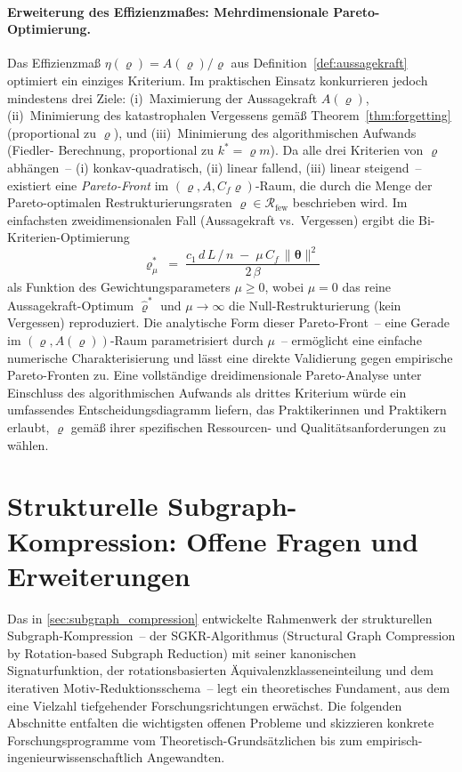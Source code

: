 ﻿\documentclass[12pt, a4paper, openany]{report}
\newcommand{\calR}{\mathcal{R}}
\begin{document}
\paragraph{Erweiterung des Effizienzmaßes: Mehrdimensionale
Pareto-Optimierung.}
Das Effizienzmaß $\eta(\varrho) = A(\varrho)/\varrho$ aus
Definition~\ref{def:aussagekraft} optimiert ein einziges Kriterium.  Im
praktischen Einsatz konkurrieren jedoch mindestens drei Ziele:
(i)~Maximierung der Aussagekraft $A(\varrho)$, (ii)~Minimierung des
katastrophalen Vergessens gemäß Theorem~\ref{thm:forgetting} (proportional
zu $\varrho$), und (iii)~Minimierung des algorithmischen Aufwands (Fiedler-
Berechnung, proportional zu $k^* = \varrho m$).  Da alle drei Kriterien
von $\varrho$ abhängen~-- (i) konkav-quadratisch, (ii) linear fallend,
(iii) linear steigend~-- existiert eine \emph{Pareto-Front} im
$(\varrho, A, C_f\varrho)$-Raum, die durch die Menge der Pareto-optimalen
Restrukturierungsraten $\varrho \in \calR_{\mathrm{few}}$ beschrieben wird.
Im einfachsten zweidimensionalen Fall (Aussagekraft vs.\ Vergessen) ergibt
die Bi-Kriterien-Optimierung
\[
  \varrho^*_{\mu}
  \;=\; \frac{c_1\,d\,L\,/\,n \;-\; \mu\,C_f\,\|\bm\theta\|^2}{2\,\beta}
\]
als Funktion des Gewichtungsparameters $\mu \geq 0$, wobei $\mu = 0$ das
reine Aussagekraft-Optimum $\hat\varrho^*$ und $\mu \to \infty$ die
Null-Restrukturierung (kein Vergessen) reproduziert.  Die analytische Form
dieser Pareto-Front~-- eine Gerade im $(\varrho, A(\varrho))$-Raum
parametrisiert durch $\mu$~-- ermöglicht eine einfache numerische
Charakterisierung und lässt eine direkte Validierung gegen empirische
Pareto-Fronten zu.  Eine vollständige dreidimensionale Pareto-Analyse unter
Einschluss des algorithmischen Aufwands als drittes Kriterium würde ein
umfassendes Entscheidungsdiagramm liefern, das Praktikerinnen und Praktikern
erlaubt, $\varrho$ gemäß ihrer spezifischen Ressourcen- und
Qualitätsanforderungen zu wählen.

\section{Strukturelle Subgraph-Kompression: Offene Fragen und Erweiterungen}
\label{sec:outlook_subgraph}

Das in \cref{sec:subgraph_compression} entwickelte Rahmenwerk der strukturellen
Subgraph-Kom\-pression~-- der SGKR-Algorithmus (Structural Graph Compression by
Rotation-based Subgraph Reduction) mit seiner kanonischen Signaturfunktion,
der rotationsbasierten Äquivalenzklasseneinteilung und dem iterativen
Motiv-Reduktionsschema~-- legt ein theoretisches Fundament, aus dem eine
Vielzahl tiefgehender Forschungsrichtungen erwächst.  Die folgenden Abschnitte
entfalten die wichtigsten offenen Probleme und skizzieren konkrete
Forschungsprogramme vom Theoretisch-Grundsätzlichen bis zum
empirisch-ingenieurwissenschaftlich Angewandten.
\end{document}

